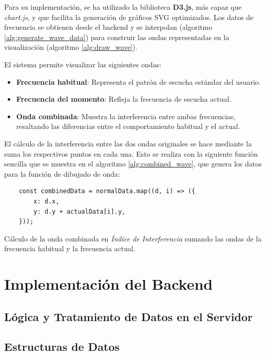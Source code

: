 Para su implementación, se ha utilizado la biblioteca \textbf{D3.js}, más capaz que \textit{chart.js}, y que facilita la generación de gráficos SVG optimizados. Los datos de frecuencia se obtienen desde el backend y se interpolan (algoritmo \ref{alg:generate_wave_data}) para construir las ondas representadas en la visualización (algoritmo \ref{alg:draw_wave}).

El sistema permite visualizar las siguientes ondas:
\begin{itemize}
    \item \textbf{Frecuencia habitual}: Representa el patrón de escucha estándar del usuario.
    \item \textbf{Frecuencia del momento}: Refleja la frecuencia de escucha actual.
    \item \textbf{Onda combinada}: Muestra la interferencia entre ambas frecuencias, resaltando las diferencias entre el comportamiento habitual y el actual.
\end{itemize}

El cálculo de la interferencia entre las dos ondas originales se hace mediante la suma los respectivos puntos en cada una. Esto se realiza con la siguiente función sencilla que se muestra en el algoritmo \ref{alg:combined_wave}, que genera los datos para la función de dibujado de onda:

\begin{ifalgorithm}[H]
    \begin{lstlisting}
    const combinedData = normalData.map((d, i) => ({
        x: d.x,
        y: d.y + actualData[i].y,
    }));
    \end{lstlisting}
    \caption{Cálculo de la onda combinada en \textit{Índice de Interferencia} sumando las ondas de la frecuencia habitual y la frecuencia actual.}
    \label{alg:combined_wave}
\end{ifalgorithm}


\section{Implementación del Backend}

\subsection{Lógica y Tratamiento de Datos en el Servidor}

\subsection{Estructuras de Datos}

